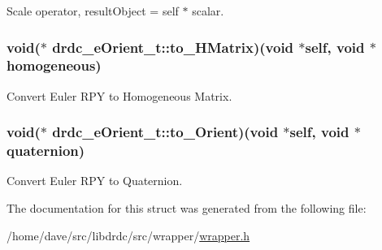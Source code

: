 Scale operator, resultObject = self $\ast$ scalar. 

\hypertarget{structdrdc__eOrient__t_1f0f733ea654b9de7c350049fe7f8e73}{
\subsubsection[to\_\-HMatrix]{\setlength{\rightskip}{0pt plus 5cm}void($\ast$ {\bf drdc\_\-eOrient\_\-t::to\_\-HMatrix})(void $\ast$self, void $\ast$homogeneous)}}
\label{structdrdc__eOrient__t_1f0f733ea654b9de7c350049fe7f8e73}


Convert Euler RPY to Homogeneous Matrix. 

\hypertarget{structdrdc__eOrient__t_563921c3128004ab185e357400953dee}{
\subsubsection[to\_\-Orient]{\setlength{\rightskip}{0pt plus 5cm}void($\ast$ {\bf drdc\_\-eOrient\_\-t::to\_\-Orient})(void $\ast$self, void $\ast$quaternion)}}
\label{structdrdc__eOrient__t_563921c3128004ab185e357400953dee}


Convert Euler RPY to Quaternion. 



The documentation for this struct was generated from the following file:\begin{CompactItemize}
\item 
/home/dave/src/libdrdc/src/wrapper/\hyperlink{wrapper_8h}{wrapper.h}\end{CompactItemize}
